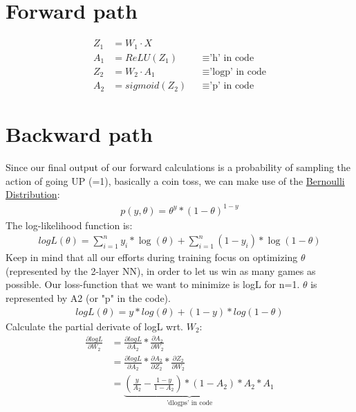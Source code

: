 \documentclass{article} %
\begin{document}
    
    \section{Forward path} 
    \begin{align*}
        Z_{1} &= W_{1} \cdot X \\
        A_{1} &= ReLU(Z_{1}) && \equiv \text{'h' in code} \\
        Z_{2} &= W_{2} \cdot A_{1} && \equiv \text{'logp' in code} \\
        A_{2} &= sigmoid(Z_{2}) && \equiv \text{'p' in code}
    \end{align*}
    
    \section{Backward path}
    Since our final output of our forward calculations is a probability of sampling the action of going UP (=1),
    basically a coin toss, we can make use of the \href{https://en.wikipedia.org/wiki/Bernoulli_distribution}{Bernoulli Distribution}:
    \begin{align*}
        p(y, \theta) = \theta^y * (1 - \theta)^{1 - y}
    \end{align*}
    The log-likelihood function is:
    \begin{align*}
        logL(\theta) = \sum_{i=1}^{n} y_{i} * \log(\theta) + \sum_{i=1}^{n} (1 - y_{i}) * \log(1 - \theta)
    \end{align*}
    Keep in mind that all our efforts during training focus on optimizing $\theta$ (represented by the 2-layer NN), in order to let us win as many games as possible.  
    Our loss-function that we want to minimize is logL for n=1. $\theta$ is represented by A2 (or "p" in the code).
    \begin{align*}
        logL(\theta) = y * log(\theta) + (1 - y) * log(1 - \theta)
    \end{align*}
    Calculate the partial derivate of logL wrt. $W_{2}$:
    \begin{align*}
        \frac{\partial logL}{\partial W_{2}} &= \frac{\partial logL}{\partial A_{2}} * \frac{\partial A_{2}}{\partial W_{2}} \\
        &= \frac{\partial logL}{\partial A_{2}} * \frac{\partial A_{2}}{\partial Z_{2}}  * \frac{\partial Z_{2}}{\partial W_{2}} \\
        &= \underbrace{(\frac{y}{A_{2}} - \frac{1 - y}{1 - A_{2}}) * (1 - A_{2}) * A_{2}}_\text{'dlogps' in code}  * A_{1} \\
    \end{align*}
\end{document}
